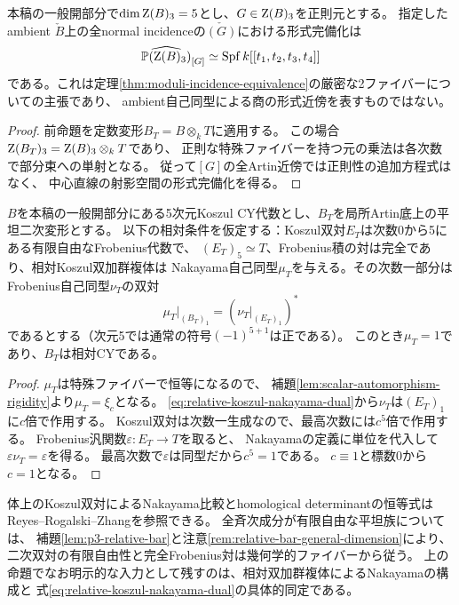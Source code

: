 \begin{corollary}[固定ambient上の全ファイバーの四次元形式近傍]
\label{cor:indexed-normal-four-dimensional-fibre}
本稿の一般開部分で$\dim\operatorname{Z}(B)_3=5$とし、$G\in\operatorname{Z}(B)_3$を正則元とする。
指定したambient $\check B$上の全normal incidenceの$\check{(G)}$における形式完備化は
\[
 \widehat{\mathbb P(\operatorname{Z}(B)_3)}_{[G]}
 \simeq\operatorname{Spf}k[[t_1,t_2,t_3,t_4]]
\]
である。これは定理\ref{thm:moduli-incidence-equivalence}の厳密な2ファイバーについての主張であり、
ambient自己同型による商の形式近傍を表すものではない。
\end{corollary}
\begin{proof}
前命題を定数変形$B_T=B\otimes_kT$に適用する。
この場合$\operatorname{Z}(B_T)_3=\operatorname{Z}(B)_3\otimes_kT$であり、
正則な特殊ファイバーを持つ元の乗法は各次数で部分束への単射となる。
従って$[G]$の全Artin近傍では正則性の追加方程式はなく、
中心直線の射影空間の形式完備化を得る。
\end{proof}

\begin{proposition}
\label{prop:relative-nakayama-rigidity}
$B$を本稿の一般開部分にある5次元Koszul CY代数とし、$B_T$を局所Artin底上の平坦二次変形とする。
以下の相対条件を仮定する：Koszul双対$E_T$は次数0から5にある有限自由なFrobenius代数で、
$(E_T)_5\simeq T$、Frobenius積の対は完全であり、相対Koszul双加群複体は
Nakayama自己同型$\mu_T$を与える。その次数一部分はFrobenius自己同型$\nu_T$の双対
\begin{equation}\label{eq:relative-koszul-nakayama-dual}
 \mu_T|_{(B_T)_1}=(\nu_T|_{(E_T)_1})^*
\end{equation}
であるとする（次元5では通常の符号$(-1)^{5+1}$は正である）。
このとき$\mu_T=1$であり、$B_T$は相対CYである。
\end{proposition}
\begin{proof}
$\mu_T$は特殊ファイバーで恒等になるので、
補題\ref{lem:scalar-automorphism-rigidity}より$\mu_T=\xi_c$となる。
\eqref{eq:relative-koszul-nakayama-dual}から$\nu_T$は$(E_T)_1$に$c$倍で作用する。
Koszul双対は次数一生成なので、最高次数には$c^5$倍で作用する。
Frobenius汎関数$\varepsilon:E_T\to T$を取ると、
Nakayamaの定義に単位を代入して$\varepsilon\nu_T=\varepsilon$を得る。
最高次数で$\varepsilon$は同型だから$c^5=1$である。
$c\equiv1$と標数0から$c=1$となる。
\end{proof}

体上のKoszul双対によるNakayama比較とhomological determinantの恒等式は
Reyes--Rogalski--Zhang\cite[Theorem~6.3 and its proof]{RRZHomological}を参照できる。
全斉次成分が有限自由な平坦族については、
補題\ref{lem:p3-relative-bar}と注意\ref{rem:relative-bar-general-dimension}により、
二次双対の有限自由性と完全Frobenius対は幾何学的ファイバーから従う。
上の命題でなお明示的な入力として残すのは、相対双加群複体によるNakayamaの構成と
式\eqref{eq:relative-koszul-nakayama-dual}の具体的同定である。


